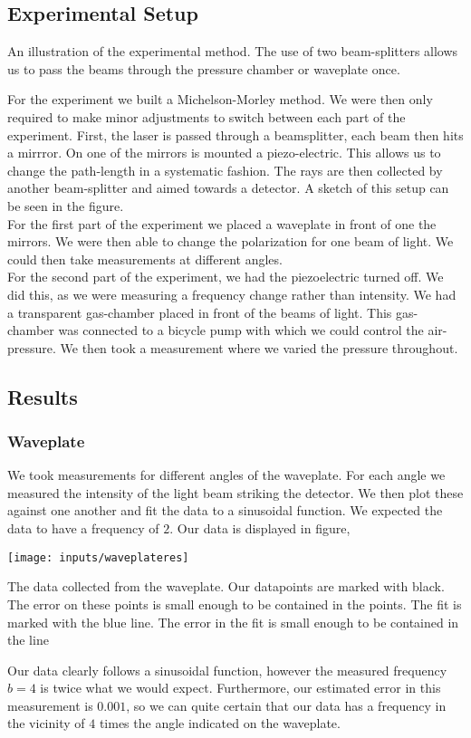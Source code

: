 \documentclass[working, oneside]{inputs/tuftebook}
\begin{document}
\subsection*{Experimental Setup}
\begin{marginfigure}[-50pt]
	\centering
	\caption{An illustration of the experimental method. The use of two beam-splitters allows us to pass the beams through the pressure chamber or waveplate once.}
	\label{fig:}
\end{marginfigure}
For the experiment we built a Michelson-Morley method. We were then only required to make minor adjustments to switch between each part of the experiment. First, the laser is passed through a beamsplitter, each beam then hits a mirrror. On one of the mirrors is mounted a piezo-electric. This allows us to change the path-length in a systematic fashion. The rays are then collected by another beam-splitter and aimed towards a detector. A sketch of this setup can be seen in the figure. \\
For the first part of the experiment we placed a waveplate in front of one the mirrors. We were then able to change the polarization for one beam of light. We could then take measurements at different angles. 
\\
For the second part of the experiment, we had the piezoelectric turned off. We did this, as we were measuring a frequency change rather than intensity. We had a transparent gas-chamber placed in front of the beams of light. This gas-chamber was connected to a bicycle pump with which we could control the air-pressure. We then took a measurement where we varied the pressure throughout. 
\subsection*{Results}
\subsubsection*{Waveplate}
We took measurements for different angles of the waveplate. For each angle we measured the intensity of the light beam striking the detector. We then plot these against one another and fit the data to a sinusoidal function. We expected the data to have a frequency of $2$. Our data is displayed in figure,
\begin{marginfigure}[-25pt]
	\centering
	\texttt{[image: inputs/waveplateres]}
	\caption{The data collected from the waveplate. Our datapoints are marked with black. The error on these points is small enough to be contained in the points. The fit is marked with the blue line. The error in the fit is small enough to be contained in the line}
\end{marginfigure}
Our data clearly follows a sinusoidal function, however the measured frequency $b = 4$ is twice what we would expect. Furthermore, our estimated error in this measurement is $0.001$, so we can quite certain that our data has a frequency in the vicinity of $4$ times the angle indicated on the waveplate. 
\end{document}
